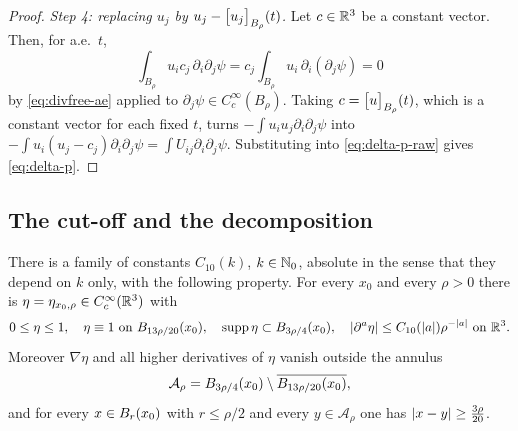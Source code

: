 \documentclass[11pt,reqno]{amsart}
\begin{document}
\begin{proof}
\emph{Step 4: replacing $u_{j}$ by $u_{j}-\bigl[u_{j}\bigr]_{B_{\rho}}(t)$.} Let
$c\in\mathbb{R}^{3}$ be a constant vector. Then, for a.e.\ $t$,
\[
  \int_{B_{\rho}}u_{i}c_{j}\,\partial_{i}\partial_{j}\psi
  =c_{j}\int_{B_{\rho}}u_{i}\,\partial_{i}(\partial_{j}\psi)
  =0
\]
by \eqref{eq:divfree-ae} applied to $\partial_{j}\psi\in C_{c}^{\infty}(B_{\rho})$.
Taking $c=\bigl[u\bigr]_{B_{\rho}}(t)$, which is a constant vector for each fixed $t$,
turns $-\int u_{i}u_{j}\partial_{i}\partial_{j}\psi$ into
$-\int u_{i}(u_{j}-c_{j})\partial_{i}\partial_{j}\psi
 =\int U_{ij}\partial_{i}\partial_{j}\psi$. Substituting into
\eqref{eq:delta-p-raw} gives \eqref{eq:delta-p}.
\end{proof}

\subsection{The cut-off and the decomposition}\label{ss:pressure-decomposition}

\begin{lemma}\label{lem:cutoff}
There is a family of constants $C_{10}(k)$, $k\in\mathbb{N}_{0}$, absolute in the sense
that they depend on $k$ only, with the following property. For every $x_{0}$ and
every $\rho>0$ there is $\eta=\eta_{x_{0},\rho}\in C_{c}^{\infty}(\mathbb{R}^{3})$ with
\begin{equation}\label{eq:cutoff}
  0\le\eta\le1,\quad
  \eta\equiv1\ \text{on}\ B_{13\rho/20}(x_{0}),\quad
  \operatorname{supp}\eta\subset B_{3\rho/4}(x_{0}),\quad
  \left\lvert \partial^{a}\eta \right\rvert\le C_{10}(\left\lvert a \right\rvert)\rho^{-\left\lvert a \right\rvert}\ \text{on }\mathbb{R}^{3}.
\end{equation}
Moreover $\nabla\eta$ and all higher derivatives of $\eta$ vanish outside the
annulus
\begin{equation}\label{eq:annulus}
  \mathcal{A}_{\rho}=B_{3\rho/4}(x_{0})\setminus\overline{B_{13\rho/20}(x_{0})},
\end{equation}
and for every $x\in B_{r}(x_{0})$ with $r\le\rho/2$ and every
$y\in\mathcal{A}_{\rho}$ one has $\left\lvert x-y \right\rvert\ge\tfrac{3\rho}{20}$.
\end{lemma}
\end{document}
